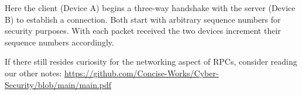 \noindent
Here the client (Device A) begins a three-way handshake with the server (Device B) to establish a connection. Both start with 
arbitrary sequence numbers for security purposes. With each packet received the two devices increment their sequence numbers accordingly.\\

\begin{Tip} If there still resides curiosity for the networking aspect of RPCs, consider reading our other notes:
    \href{https://github.com/Concise-Works/Cyber-Security/blob/main/main.pdf}{https://github.com/Concise-Works/Cyber-Security/blob/main/main.pdf}
\end{Tip}